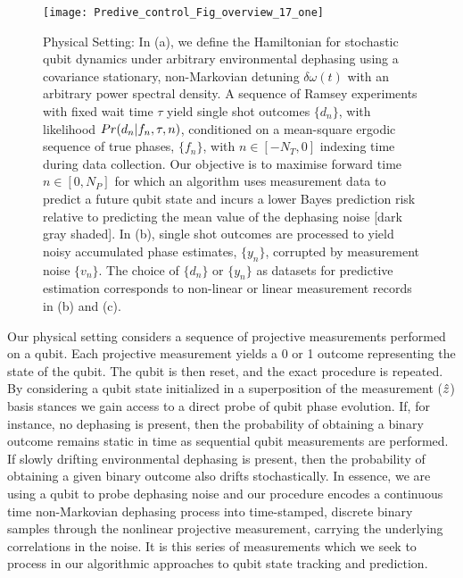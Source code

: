 \begin{figure}[h!]
    \texttt{[image: Predive\_control\_Fig\_overview\_17\_one]} 
    \caption{ \label{fig:main:Predive_control_Fig_overview_17_one} Physical Setting: In (a), we define the Hamiltonian for stochastic qubit dynamics under arbitrary environmental dephasing using a covariance stationary, non-Markovian detuning $\delta \omega(t)$ with an arbitrary power spectral density. A sequence of Ramsey experiments with fixed wait time $\tau$ yield single shot outcomes $\{ d_n \}$, with likelihood $Pr(d_n|f_n, \tau,n)$,  conditioned on a mean-square ergodic sequence of true phases, $\{ f_n\}$, with $n \in [-N_T, 0]$ indexing time during data collection. Our objective is to maximise forward time $n \in [0, N_P]$ for which an algorithm uses measurement data to predict a future qubit state and incurs a lower Bayes prediction risk relative to predicting the mean value of the dephasing noise [dark gray shaded]. In (b), single shot outcomes are processed to yield noisy accumulated phase estimates, $\{ y_n\}$, corrupted by measurement noise $\{v_n\}$. The choice of $\{d_n\}$ or $\{y_n\}$ as datasets for predictive estimation corresponds to non-linear or linear measurement records in (b) and (c).}
\end{figure} 


 
Our physical setting considers a sequence of projective measurements performed on a qubit. Each projective measurement yields a 0 or 1 outcome representing the state of the qubit. The qubit is then reset, and the exact procedure is repeated. By considering a qubit state initialized in a superposition of the measurement ($\hat{z}$) basis stances we gain access to a direct probe of qubit phase evolution.  If, for instance, no dephasing is present, then the probability of obtaining a binary outcome remains static in time as sequential qubit measurements are performed. If slowly drifting environmental dephasing is present, then the probability of obtaining a given binary outcome also drifts stochastically. In essence, we are using a qubit to probe dephasing noise and our procedure encodes a continuous time non-Markovian dephasing process into time-stamped, discrete binary samples through the nonlinear projective measurement, carrying the underlying correlations in the noise.  It is this series of measurements which we seek to process in our algorithmic approaches to qubit state tracking and prediction. 

